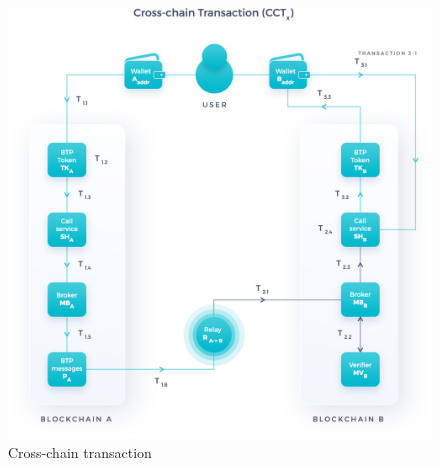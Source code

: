 \documentclass{article}
\begin{document}
\begin{figure}[!ht]
\begin{center}
\includegraphics[width=12cm]{./images/Cross-chain Transaction.png}
\caption{Cross-chain transaction}
\label{fig:cct}
\end{center}
\end{figure}
\end{document}
